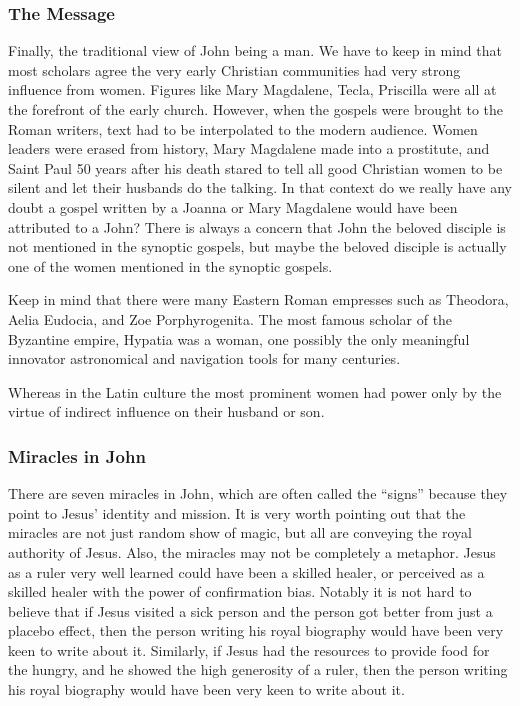 \subsubsection{The Message}\label{subsubsec:the-message}

Finally, the traditional view of John being a man.
We have to keep in mind that most scholars agree the very early Christian communities had very strong influence from women.
Figures like Mary Magdalene, Tecla, Priscilla were all at the forefront of the early church.
However, when the gospels were brought to the Roman writers, text had to be interpolated to the modern audience.
Women leaders were erased from history, Mary Magdalene made into a prostitute, and Saint Paul 50 years after his death stared to tell all good Christian women to be silent and let their husbands do the talking.
In that context do we really have any doubt a gospel written by a Joanna or Mary Magdalene would have been attributed to a John?
There is always a concern that John the beloved disciple is not mentioned in the synoptic gospels, but maybe the beloved disciple is actually one of the women mentioned in the synoptic gospels.

Keep in mind that there were many Eastern Roman empresses such as Theodora, Aelia Eudocia, and Zoe Porphyrogenita.
The most famous scholar of the Byzantine empire, Hypatia was a woman, one possibly the only meaningful innovator astronomical and navigation tools for many centuries.

Whereas in the Latin culture the most prominent women had power only by the virtue of indirect influence on their husband or son.

\subsubsection{Miracles in John}\label{par:miracles-in-john}

There are seven miracles in John, which are often called the ``signs'' because they point to Jesus' identity and mission.
It is very worth pointing out that the miracles are not just random show of magic, but all are conveying the royal authority of Jesus.
Also, the miracles may not be completely a metaphor.
Jesus as a ruler very well learned could have been a skilled healer, or perceived as a skilled healer with the power of confirmation bias.
Notably it is not hard to believe that if Jesus visited a sick person and the person got better from just a placebo effect, then the person writing his royal biography would have been very keen to write about it.
Similarly, if Jesus had the resources to provide food for the hungry, and he showed the high generosity of a ruler, then the person writing his royal biography would have been very keen to write about it.

